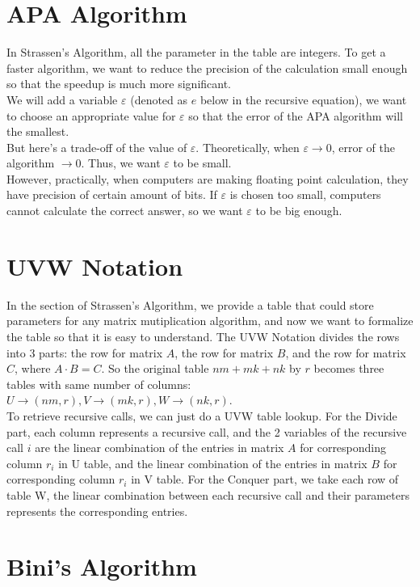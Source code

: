 \documentclass{article}
\begin{document}
\section{APA Algorithm}
In Strassen's Algorithm, all the parameter in the table are integers. To get a faster algorithm, we want to reduce the precision of the calculation small enough so that the speedup is much more significant.\\
We will add a variable $\varepsilon$ (denoted as $e$ below in the recursive equation), we want to choose an appropriate value for $\varepsilon$ so that the error of the APA algorithm will the smallest.\\
But here's a trade-off of the value of $\varepsilon$. Theoretically, when $\varepsilon \to 0$, error of the algorithm $\to 0$. Thus, we want $\varepsilon$ to be small.\\
However, practically, when computers are making floating point calculation, they have precision of certain amount of bits. If $\varepsilon$ is chosen too small, computers cannot calculate the correct answer, so we want $\varepsilon$ to be big enough.

\section{UVW Notation}
In the section of Strassen's Algorithm, we provide a table that could store parameters for any matrix mutiplication algorithm,  and now we want to formalize the table so that it is easy to understand. The UVW Notation divides the rows into 3 parts: the row for matrix $A$, the row for matrix $B$, and the row for matrix $C$, where $A\cdot B = C$. So the original table $nm+mk+nk$ by $r$ becomes three tables with same number of columns: $U \rightarrow (nm,r), V\rightarrow(mk,r), W\rightarrow(nk,r)$.\\
To retrieve recursive calls, we can just do a UVW table lookup. For the Divide part, each column represents a recursive call, and the 2 variables of the recursive call $i$ are the linear combination of the entries in matrix $A$ for corresponding column $r_i$ in U table, and the linear combination of the entries in matrix $B$ for corresponding column $r_i$ in V table. For the Conquer part, we take each row of table W, the linear combination between each recursive call and their parameters represents the corresponding entries.


\section{Bini's Algorithm \cite{BCRL79}}
\end{document}
